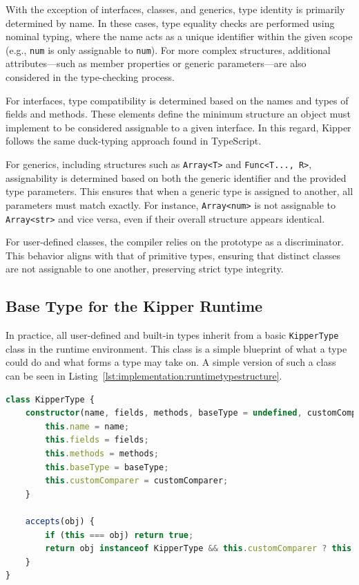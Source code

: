 With the exception of interfaces, classes, and generics, type identity is primarily determined by name. In these cases, type equality checks are performed using nominal typing, where the name acts as a unique identifier within the given scope (e.g., \lstinline|num| is only assignable to \lstinline|num|). For more complex structures, additional attributes—such as member properties or generic parameters—are also considered in the type-checking process.

For interfaces, type compatibility is determined based on the names and types of fields and methods. These elements define the minimum structure an object must implement to be considered assignable to a given interface. In this regard, Kipper follows the same duck-typing approach found in TypeScript.

For generics, including structures such as \lstinline|Array<T>| and \lstinline|Func<T..., R>|, assignability is determined based on both the generic identifier and the provided type parameters. This ensures that when a generic type is assigned to another, all parameters must match exactly. For instance, \lstinline|Array<num>| is not assignable to \lstinline|Array<str>| and vice versa, even if their overall structure appears identical.

For user-defined classes, the compiler relies on the prototype as a discriminator. This behavior aligns with that of primitive types, ensuring that distinct classes are not assignable to one another, preserving strict type integrity.

\subsection{Base Type for the Kipper Runtime}
\label{sec:basetype}

In practice, all user-defined and built-in types inherit from a basic \lstinline|KipperType| class in the runtime environment. This class is a simple blueprint of what a type could do and what forms a type may take on. A simple version of such a class can be seen in Listing~\ref{lst:implementation:runtimetypestructure}.

\begin{lstlisting}[float,language=TypeScript,caption=The structure of a runtime type,label=lst:implementation:runtimetypestructure]
class KipperType {
	constructor(name, fields, methods, baseType = undefined, customComparer = undefined) {
		this.name = name;
		this.fields = fields;
		this.methods = methods;
		this.baseType = baseType;
		this.customComparer = customComparer;
	}

	accepts(obj) {
		if (this === obj) return true;
		return obj instanceof KipperType && this.customComparer ? this.customComparer(this, obj) : false;
	}
}
\end{lstlisting}

